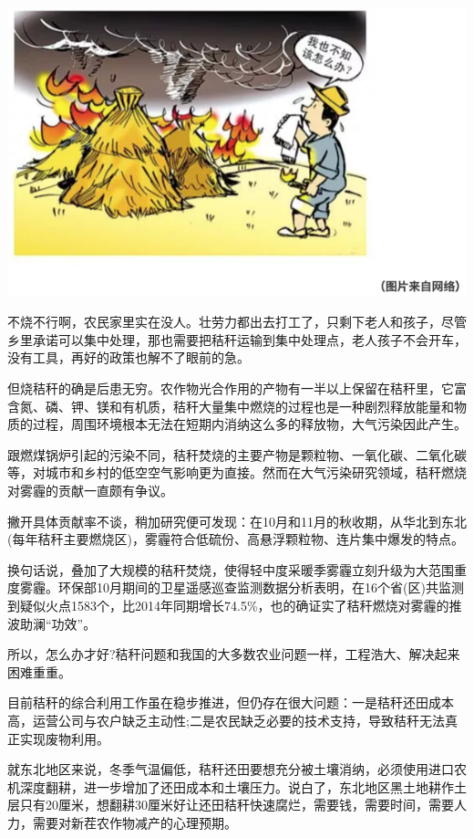 \documentclass[
]{book}
\begin{document}
\includegraphics[width=8.33in]{images/stalk2}

不烧不行啊，农民家里实在没人。壮劳力都出去打工了，只剩下老人和孩子，尽管乡里承诺可以集中处理，那也需要把秸秆运输到集中处理点，老人孩子不会开车，没有工具，再好的政策也解不了眼前的急。

但烧秸秆的确是后患无穷。农作物光合作用的产物有一半以上保留在秸秆里，它富含氮、磷、钾、镁和有机质，秸秆大量集中燃烧的过程也是一种剧烈释放能量和物质的过程，周围环境根本无法在短期内消纳这么多的释放物，大气污染因此产生。

跟燃煤锅炉引起的污染不同，秸秆焚烧的主要产物是颗粒物、一氧化碳、二氧化碳等，对城市和乡村的低空空气影响更为直接。然而在大气污染研究领域，秸秆燃烧对雾霾的贡献一直颇有争议。

撇开具体贡献率不谈，稍加研究便可发现：在10月和11月的秋收期，从华北到东北(每年秸秆主要燃烧区)，雾霾符合低硫份、高悬浮颗粒物、连片集中爆发的特点。

换句话说，叠加了大规模的秸秆焚烧，使得轻中度采暖季雾霾立刻升级为大范围重度雾霾。环保部10月期间的卫星遥感巡查监测数据分析表明，在16个省(区)共监测到疑似火点1583个，比2014年同期增长74.5\%，也的确证实了秸秆燃烧对雾霾的推波助澜``功效''。

所以，怎么办才好?秸秆问题和我国的大多数农业问题一样，工程浩大、解决起来困难重重。

目前秸秆的综合利用工作虽在稳步推进，但仍存在很大问题：一是秸秆还田成本高，运营公司与农户缺乏主动性;二是农民缺乏必要的技术支持，导致秸秆无法真正实现废物利用。

就东北地区来说，冬季气温偏低，秸秆还田要想充分被土壤消纳，必须使用进口农机深度翻耕，进一步增加了还田成本和土壤压力。说白了，东北地区黑土地耕作土层只有20厘米，想翻耕30厘米好让还田秸秆快速腐烂，需要钱，需要时间，需要人力，需要对新茬农作物减产的心理预期。
\end{document}
